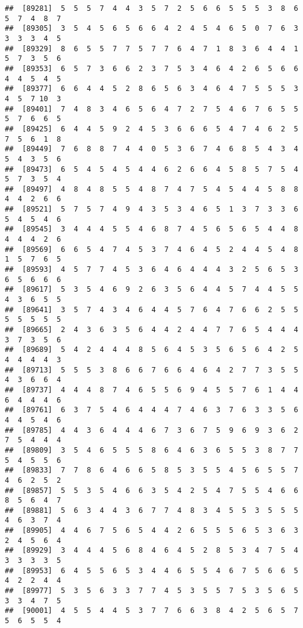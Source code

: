 \documentclass[
]{book}
\begin{document}
\begin{verbatim}
##  [89281]  5  5  5  7  4  4  3  5  7  2  5  6  6  5  5  5  3  8  6  5  7  4  8  7
##  [89305]  3  5  4  5  6  5  6  6  4  2  4  5  4  6  5  0  7  6  3  3  3  3  4  5
##  [89329]  8  6  5  5  7  7  5  7  7  6  4  7  1  8  3  6  4  4  1  5  7  3  5  6
##  [89353]  6  5  7  3  6  6  2  3  7  5  3  4  6  4  2  6  5  6  6  4  4  5  4  5
##  [89377]  6  6  4  4  5  2  8  6  5  6  3  4  6  4  7  5  5  5  3  4  5  7 10  3
##  [89401]  7  4  8  3  4  6  5  6  4  7  2  7  5  4  6  7  6  5  5  5  7  6  6  5
##  [89425]  6  4  4  5  9  2  4  5  3  6  6  6  5  4  7  4  6  2  5  7  5  6  1  8
##  [89449]  7  6  8  8  7  4  4  0  5  3  6  7  4  6  8  5  4  3  4  5  4  3  5  6
##  [89473]  6  5  4  5  4  5  4  4  6  2  6  6  4  5  8  5  7  5  4  5  7  3  5  4
##  [89497]  4  8  4  8  5  5  4  8  7  4  7  5  4  5  4  4  5  8  8  4  4  2  6  6
##  [89521]  5  7  5  7  4  9  4  3  5  3  4  6  5  1  3  7  3  3  6  5  4  5  4  6
##  [89545]  3  4  4  4  5  5  4  6  8  7  4  5  6  5  6  5  4  4  8  4  4  4  2  6
##  [89569]  6  6  5  4  7  4  5  3  7  4  6  4  5  2  4  4  5  4  8  1  5  7  6  5
##  [89593]  4  5  7  7  4  5  3  6  4  6  4  4  4  3  2  5  6  5  3  6  5  6  6  6
##  [89617]  5  3  5  4  6  9  2  6  3  5  6  4  4  5  7  4  4  5  5  4  3  6  5  5
##  [89641]  3  5  7  4  3  4  6  4  4  5  7  6  4  7  6  6  2  5  5  5  5  5  5  5
##  [89665]  2  4  3  6  3  5  6  4  4  2  4  4  7  7  6  5  4  4  4  3  7  3  5  6
##  [89689]  5  4  2  4  4  4  8  5  6  4  5  3  5  6  5  6  4  2  5  4  4  4  4  3
##  [89713]  5  5  5  3  8  6  6  7  6  6  4  6  4  2  7  7  3  5  5  4  3  6  6  4
##  [89737]  4  4  4  8  7  4  6  5  5  6  9  4  5  5  7  6  1  4  4  6  4  4  4  6
##  [89761]  6  3  7  5  4  6  4  4  4  7  4  6  3  7  6  3  3  5  6  4  4  5  4  6
##  [89785]  4  4  3  6  4  4  4  6  7  3  6  7  5  9  6  9  3  6  2  7  5  4  4  4
##  [89809]  3  5  4  6  5  5  5  8  6  4  6  3  6  5  5  3  8  7  7  5  4  5  5  6
##  [89833]  7  7  8  6  4  6  6  5  8  5  3  5  5  4  5  6  5  5  7  4  6  2  5  2
##  [89857]  5  5  3  5  4  6  6  3  5  4  2  5  4  7  5  5  4  6  6  8  5  6  4  7
##  [89881]  5  6  3  4  4  3  6  7  7  4  8  3  4  5  5  3  5  5  5  4  6  3  7  4
##  [89905]  4  4  6  7  5  6  5  4  4  2  6  5  5  5  6  5  3  6  3  2  4  5  6  4
##  [89929]  3  4  4  4  5  6  8  4  6  4  5  2  8  5  3  4  7  5  4  3  3  3  3  5
##  [89953]  6  4  5  5  6  5  3  4  4  6  5  5  4  6  7  5  6  6  5  4  2  2  4  4
##  [89977]  5  3  5  6  3  3  7  7  4  5  3  5  5  7  5  3  5  6  5  3  3  4  7  5
##  [90001]  4  5  5  4  4  5  3  7  7  6  6  3  8  4  2  5  6  5  7  5  6  5  5  4

\end{verbatim}
\end{document}
